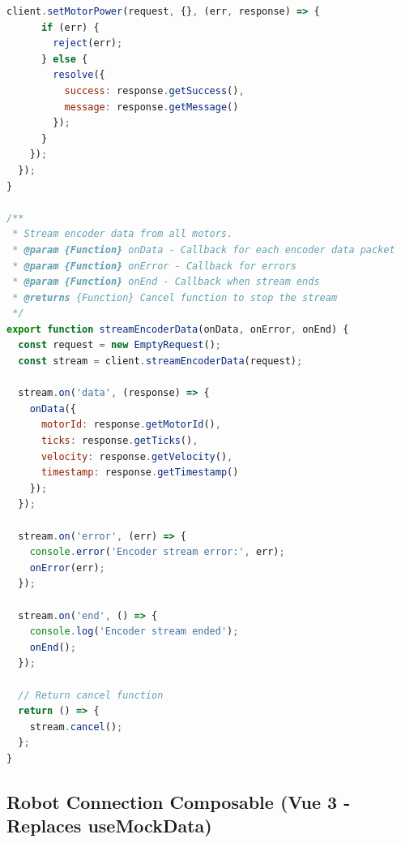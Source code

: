\documentclass[11pt,letterpaper]{article}
\begin{document}
\begin{lstlisting}[language=JavaScript, caption=src/grpc/client.js]
    client.setMotorPower(request, {}, (err, response) => {
      if (err) {
        reject(err);
      } else {
        resolve({
          success: response.getSuccess(),
          message: response.getMessage()
        });
      }
    });
  });
}

/**
 * Stream encoder data from all motors.
 * @param {Function} onData - Callback for each encoder data packet
 * @param {Function} onError - Callback for errors
 * @param {Function} onEnd - Callback when stream ends
 * @returns {Function} Cancel function to stop the stream
 */
export function streamEncoderData(onData, onError, onEnd) {
  const request = new EmptyRequest();
  const stream = client.streamEncoderData(request);

  stream.on('data', (response) => {
    onData({
      motorId: response.getMotorId(),
      ticks: response.getTicks(),
      velocity: response.getVelocity(),
      timestamp: response.getTimestamp()
    });
  });

  stream.on('error', (err) => {
    console.error('Encoder stream error:', err);
    onError(err);
  });

  stream.on('end', () => {
    console.log('Encoder stream ended');
    onEnd();
  });

  // Return cancel function
  return () => {
    stream.cancel();
  };
}
\end{lstlisting}

\subsection{Robot Connection Composable (Vue 3 - Replaces useMockData)}
\end{document}

